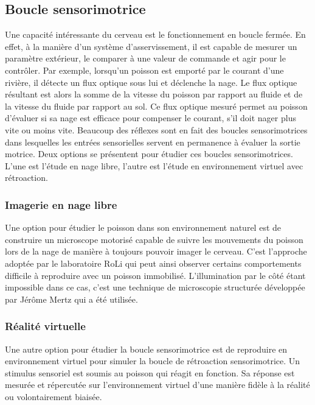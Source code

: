 
\subsection{Boucle sensorimotrice}

Une capacité intéressante du cerveau est le fonctionnement en boucle fermée. En effet, à la manière d'un système d'asservissement, il est capable de mesurer un paramètre extérieur, le comparer à une valeur de commande et agir pour le contrôler. Par exemple, lorsqu'un poisson est emporté par le courant d'une rivière, il détecte un flux optique sous lui et déclenche la nage. Le flux optique résultant est alors la somme de la vitesse du poisson par rapport au fluide et de la vitesse du fluide par rapport au sol. Ce flux optique mesuré permet au poisson d'évaluer si sa nage est efficace pour compenser le courant, s'il doit nager plus vite ou moins vite. Beaucoup des réflexes sont en fait des boucles sensorimotrices dans lesquelles les entrées sensorielles servent en permanence à évaluer la sortie motrice. Deux options se présentent pour étudier ces boucles sensorimotrices. L'une est l'étude en nage libre, l'autre est l'étude en environnement virtuel avec rétroaction.

\subsubsection{Imagerie en nage libre}

Une option pour étudier le poisson dans son environnement naturel est de construire un microscope motorisé capable de suivre les mouvements du poisson lors de la nage de manière à toujours pouvoir imager le cerveau. C'est l'approche adoptée par le laboratoire RoLi \cite{kim_pan-neuronal_2017} qui peut ainsi observer certains comportements difficile à reproduire avec un poisson immobilisé. L'illumination par le côté étant impossible dans ce cas, c'est une technique de microscopie structurée développée par Jérôme Mertz \cite{mertz_optical_2011} qui a été utilisée.

\subsubsection{Réalité virtuelle}

Une autre option pour étudier la boucle sensorimotrice est de reproduire en environnement virtuel pour simuler la boucle de rétroaction sensorimotrice. Un stimulus sensoriel est soumis au poisson qui réagit en fonction. Sa réponse est mesurée et répercutée sur l'environnement virtuel d'une manière fidèle à la réalité ou volontairement biaisée.

